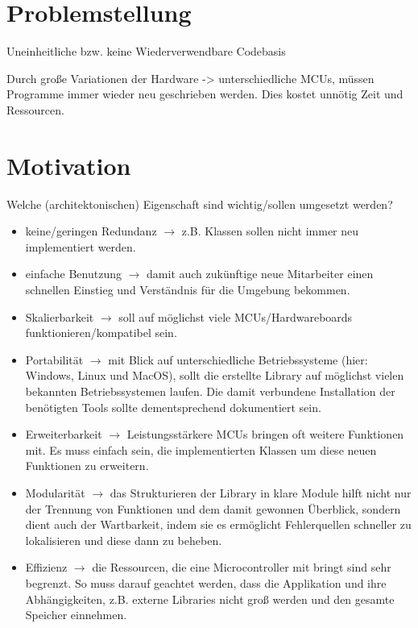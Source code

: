 \section{Problemstellung}


Uneinheitliche bzw. keine Wiederverwendbare Codebasis

Durch große Variationen der Hardware -> unterschiedliche MCUs, müssen Programme immer wieder neu geschrieben werden. Dies kostet unnötig Zeit und Ressourcen.



\section{Motivation}

Welche (architektonischen) Eigenschaft sind wichtig/sollen umgesetzt werden?
\begin{itemize}
	\item keine/geringen Redundanz $\rightarrow$ z.B. Klassen sollen nicht immer neu implementiert werden.
	\item einfache Benutzung $\rightarrow$ damit auch zukünftige neue Mitarbeiter einen schnellen Einstieg und Verständnis für die Umgebung bekommen.
	\item Skalierbarkeit $\rightarrow$ soll auf möglichst viele MCUs/Hardwareboards funktionieren/kompatibel sein.
	\item Portabilität $\rightarrow$ mit Blick auf unterschiedliche Betriebssysteme (hier: Windows, Linux und MacOS), sollt die erstellte Library auf möglichst vielen bekannten Betriebssystemen laufen. Die damit verbundene Installation der benötigten Tools sollte dementsprechend dokumentiert sein.
	\item Erweiterbarkeit $\rightarrow$ Leistungsstärkere MCUs bringen oft weitere Funktionen mit. Es muss einfach sein, die implementierten Klassen um diese neuen Funktionen zu erweitern.
	\item Modularität $\rightarrow$ das Strukturieren der Library in klare Module hilft nicht nur der Trennung von Funktionen und dem damit gewonnen Überblick, sondern dient auch der Wartbarkeit, indem sie es ermöglicht Fehlerquellen schneller zu lokalisieren und diese dann zu beheben.
	\item Effizienz $\rightarrow$ die Ressourcen, die eine Microcontroller mit bringt sind sehr begrenzt. So muss darauf geachtet werden, dass die Applikation und ihre Abhängigkeiten, z.B. externe Libraries nicht  groß werden und den gesamte Speicher einnehmen.
\end{itemize}
 

